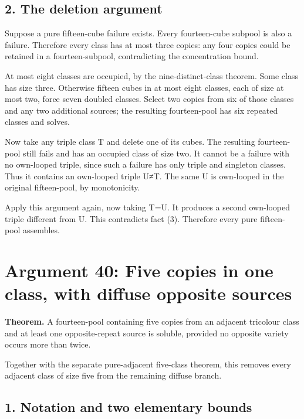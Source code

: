 \documentclass[
  10pt,
]{article}
\begin{document}
\hypertarget{the-deletion-argument}{%
\subsection*{2. The deletion argument}\label{the-deletion-argument}}

Suppose a pure fifteen-cube failure exists. Every fourteen-cube subpool
is also a failure. Therefore every class has at most three copies: any
four copies could be retained in a fourteen-subpool, contradicting the
concentration bound.

At most eight classes are occupied, by the nine-distinct-class theorem.
Some class has size three. Otherwise fifteen cubes in at most eight
classes, each of size at most two, force seven doubled classes. Select
two copies from six of those classes and any two additional sources; the
resulting fourteen-pool has six repeated classes and solves.

Now take any triple class T and delete one of its cubes. The resulting
fourteen-pool still fails and has an occupied class of size two. It
cannot be a failure with no own-looped triple, since such a failure has
only triple and singleton classes. Thus it contains an own-looped triple
U≠T. The same U is own-looped in the original fifteen-pool, by
monotonicity.

Apply this argument again, now taking T=U. It produces a second
own-looped triple different from U. This contradicts fact (3). Therefore
every pure fifteen-pool assembles.

\hypertarget{arg-40}{%
\section{Argument 40: Five copies in one class, with diffuse opposite
sources}\label{arg-40}}

\textbf{Theorem.} A fourteen-pool containing five copies from an
adjacent tricolour class and at least one opposite-repeat source is
soluble, provided no opposite variety occurs more than twice.

Together with the separate pure-adjacent five-class theorem, this
removes every adjacent class of size five from the remaining diffuse
branch.

\hypertarget{notation-and-two-elementary-bounds}{%
\subsection*{1. Notation and two elementary
bounds}\label{notation-and-two-elementary-bounds}}
\end{document}
